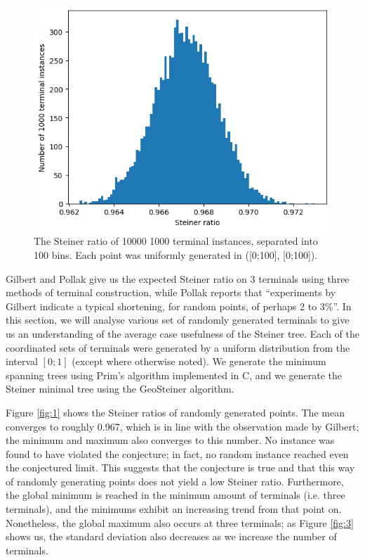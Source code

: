 \documentclass{mpaper}
\begin{document}
\begin{figure}
  \begin{center}
  \includegraphics[scale=0.5]{plot6.png}
  \end{center}
  \caption{\label{fig:6} The Steiner ratio of 10000 1000 terminal instances, separated into 100 bins. Each point was uniformly generated in ([0;100], [0;100]).}
\end{figure}

 Gilbert and Pollak \cite{GP1968} give us the expected Steiner ratio on 3 terminals using three methods of terminal construction, while Pollak \cite{POLLAK1978278} reports that ``experiments by Gilbert indicate a typical shortening, for random points, of perhaps 2 to 3\%''. In this section, we will analyse various set of randomly generated terminals to give us an understanding of the average case usefulness of the Steiner tree. Each of the coordinated sets of terminals were generated by a uniform distribution from the interval $[0;1]$ (except where otherwise noted). We generate the minimum spanning trees using Prim's algorithm implemented in C, and we generate the Steiner minimal tree using the GeoSteiner algorithm.

Figure \ref{fig:1} shows the Steiner ratios of randomly generated points. The mean converges to roughly 0.967,  which is in line with the observation made by Gilbert; the minimum and maximum also converges to this number. No instance was found to have violated the conjecture; in fact, no random instance reached even the conjectured limit. This suggests that the conjecture is true and that this way of randomly generating points does not yield a low Steiner ratio. Furthermore, the global minimum is reached in the minimum amount of terminals (i.e. three terminals), and the minimums exhibit an increasing trend from that point on. Nonetheless, the global maximum also occurs at three terminals; as Figure \ref{fig:3} shows us, the standard deviation also decreases as we increase the number of terminals.
\end{document}
